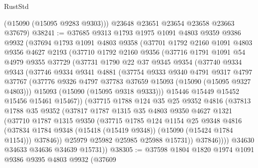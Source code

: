 \begin{lexlean}{RustStd}
\begin{coremodule}
        (@15090 (@15095 @9283 @9303)))
      @23648
      @23651
      @23654
      @23658
      @23663
      @37679)
@38241 := @37685
    @9313
    @1793
    @1975
    @1091
    @4803
    @9359
    @9386
    @9932
    (@37694
      @1793
      @1091
      @4803
      @9358
      (@37701
        @1792
        @2160
        @1091
        @4803
        @9356
        @4627
        @2193
        (@37710
          @1792
          @2160
          @9356
          (@37716
            @1791
            @1091
            @54
            @4979
            @9355
            @37729
            (@37731
              @1790
              @22
              @37
              @9345
              @9354
              (@37740
                @9334
                @9343
                (@37746
                  @9334
                  @9341
                  @4881
                  (@37754
                    @9333
                    @9340
                    @4791
                    @9317
                    @4797
                    @37767
                    (@37776 @9326 @4797 @37783 @37659 @15093 (@15090 (@15095 @9327 @4803)))
                    @15093
                    (@15090 (@15095 @9318 @9333)))
                  @15446
                  @15449
                  @15452
                  @15456
                  @15461
                  @15467))
              (@37715
                @1788
                @124
                @35
                @25
                @9352
                @4816
                (@37813
                  @1788
                  @35
                  @9352
                  (@37817
                    @1787
                    @1315
                    @35
                    @4803
                    @9350
                    @4627
                    @1321
                    (@37710
                      @1787
                      @1315
                      @9350
                      (@37715
                        @1785
                        @124
                        @1154
                        @25
                        @9348
                        @4816
                        (@37834 @1784 @9348 (@15418 (@15419 @9348)) (@15090 (@15424 @1784 @1154)))
                        @37846))
                    @25979
                    @25982
                    @25985
                    @25988
                    @15731))
                @37846))))
        @34630
        @34633
        @34636
        @34639
        @15731))
@38305 := @37598
    @1804
    @1820
    @1974
    @1091
    @9386
    @9395
    @4803
    @9932
    (@37609

\end{coremodule}
\end{lexlean}
